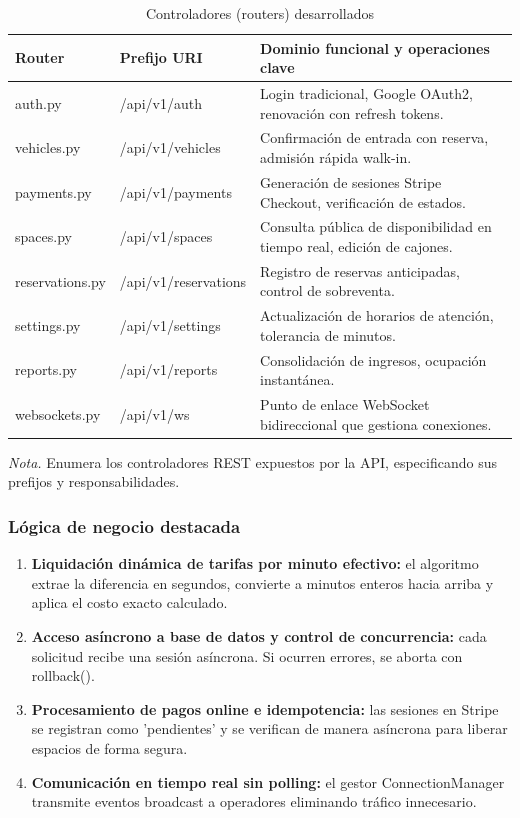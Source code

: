 \begin{table}[htbp]
\caption{Controladores (routers) desarrollados}
\label{tab:routers}
\begin{tabular}{@{}p{2.5cm} p{3cm} p{8.5cm}@{}}
\toprule
\textbf{Router} & \textbf{Prefijo URI} & \textbf{Dominio funcional y operaciones clave} \\
\midrule
auth.py & /api/v1/auth & Login tradicional, Google OAuth2, renovación con refresh tokens. \\
vehicles.py & /api/v1/vehicles & Confirmación de entrada con reserva, admisión rápida walk-in. \\
payments.py & /api/v1/payments & Generación de sesiones Stripe Checkout, verificación de estados. \\
spaces.py & /api/v1/spaces & Consulta pública de disponibilidad en tiempo real, edición de cajones. \\
reservations.py & /api/v1/reservations & Registro de reservas anticipadas, control de sobreventa. \\
settings.py & /api/v1/settings & Actualización de horarios de atención, tolerancia de minutos. \\
reports.py & /api/v1/reports & Consolidación de ingresos, ocupación instantánea. \\
websockets.py & /api/v1/ws & Punto de enlace WebSocket bidireccional que gestiona conexiones. \\
\bottomrule
\end{tabular}
\par\vspace{0.2cm}
\textit{Nota.} Enumera los controladores REST expuestos por la API, especificando sus prefijos y responsabilidades.
\end{table}

\subsubsection{Lógica de negocio destacada}



\begin{enumerate}
    \item \textbf{Liquidación dinámica de tarifas por minuto efectivo:} el algoritmo extrae la diferencia en segundos, convierte a minutos enteros hacia arriba y aplica el costo exacto calculado.
    \item \textbf{Acceso asíncrono a base de datos y control de concurrencia:} cada solicitud recibe una sesión asíncrona. Si ocurren errores, se aborta con rollback().
    \item \textbf{Procesamiento de pagos online e idempotencia:} las sesiones en Stripe se registran como 'pendientes' y se verifican de manera asíncrona para liberar espacios de forma segura.
    \item \textbf{Comunicación en tiempo real sin polling:} el gestor ConnectionManager transmite eventos broadcast a operadores eliminando tráfico innecesario.
\end{enumerate}

